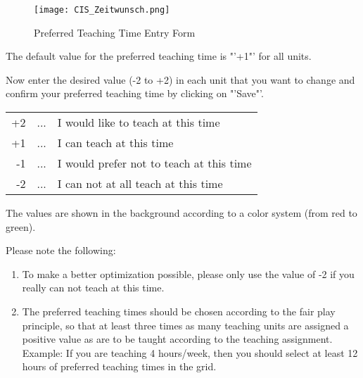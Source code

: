 \begin{figure}
	\centering
	\texttt{[image: CIS\_Zeitwunsch.png]}
	\caption{Preferred Teaching Time Entry Form}
\end{figure}

The default value for the preferred teaching time is "'+1"' for all units.

Now enter the desired value (-2 to +2) in each unit that you want to change and confirm your preferred teaching time by clicking on "'Save"'.

\begin{tabular}{rll}
+2&...&I would like to teach at this time\\
+1&...&I can teach at this time\\
-1&...&I would prefer not to teach at this time\\
-2&...&I can not at all teach at this time\\
\end{tabular}


The values are shown in the background according to a color system (from red to green).
 
Please note the following:

\begin{enumerate}
	\item To make a better optimization possible, please only use the value of -2 if you really can not teach at this time.
	\item The preferred teaching times should be chosen according to the fair play principle, so that at least three times as many teaching units are assigned a positive value as are to be taught according to the teaching assignment. \\ Example: If you are teaching 4 hours/week, then you should select at least 12 hours of preferred teaching times in the grid. 
\end{enumerate}